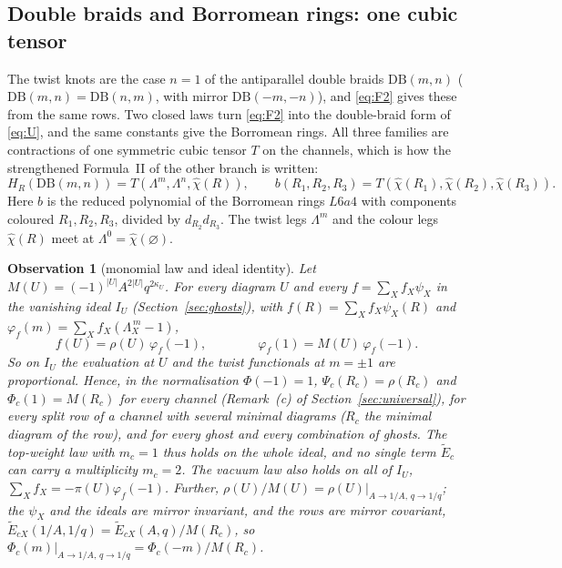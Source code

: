 \documentclass[11pt]{article}
\newtheorem{observation}{Observation}
\newcommand{\Lam}{\Lambda}
\newcommand{\Et}{\widetilde{E}}
\newcommand{\chih}{\hat\chi}
\begin{document}
\subsection{Double braids and Borromean rings: one cubic tensor}\label{sec:cubic}

The twist knots are the case $n=1$ of the antiparallel double braids $\mathrm{DB}(m,n)$ ($\mathrm{DB}(m,n)=\mathrm{DB}(n,m)$,
with mirror $\mathrm{DB}(-m,-n)$), and \eqref{eq:F2} gives these from the same rows.  Two closed laws turn \eqref{eq:F2}
into the double-braid form of \eqref{eq:U}, and the same constants give the Borromean rings.  All three families are
contractions of one symmetric cubic tensor $T$ on the channels, which is how the strengthened Formula~II of the other
branch is written:
\[
H_R(\mathrm{DB}(m,n))=T(\Lam^m,\Lam^n,\chih(R)),\qquad b(R_1,R_2,R_3)=T(\chih(R_1),\chih(R_2),\chih(R_3)).
\]
Here $b$ is the reduced polynomial of the Borromean rings $L6a4$ with components coloured $R_1,R_2,R_3$, divided by
$d_{R_2}d_{R_3}$.  The twist legs $\Lam^m$ and the colour legs $\chih(R)$ meet at $\Lam^0=\chih(\varnothing)$.

\begin{observation}[monomial law and ideal identity]\label{obs:monomial}
Let $M(U)=(-1)^{|U|}A^{2|U|}q^{2\kappa_U}$.  For every diagram $U$ and every $f=\sum_Xf_X\psi_X$ in the vanishing ideal
$I_U$ (Section~\ref{sec:ghosts}), with $f(R)=\sum_Xf_X\psi_X(R)$ and $\varphi_f(m)=\sum_Xf_X(\Lam_X^{\,m}-1)$,
\[
f(U)=\rho(U)\,\varphi_f(-1),\qquad\qquad \varphi_f(1)=M(U)\,\varphi_f(-1).
\]
So on $I_U$ the evaluation at $U$ and the twist functionals at $m=\pm1$ are proportional.  Hence, in the normalisation
$\Phi(-1)=1$, $\Psi_c(R_c)=\rho(R_c)$ and $\Phi_c(1)=M(R_c)$ for every channel (Remark~(c) of
Section~\ref{sec:universal}), for every split row of a channel with several minimal diagrams ($R_c$ the minimal diagram
of the row), and for every ghost and every combination of ghosts.  The top-weight law with $m_c=1$ thus holds on the
whole ideal, and no single term $\Et_c$ can carry a multiplicity $m_c=2$.  The vacuum law also holds on all of $I_U$,
$\sum_Xf_X=-\pi(U)\varphi_f(-1)$.  Further, $\rho(U)/M(U)=\rho(U)|_{A\to1/A,\,q\to1/q}$; the $\psi_X$ and the ideals are
mirror invariant, and the rows are mirror covariant, $\Et_{cX}(1/A,1/q)=\Et_{cX}(A,q)/M(R_c)$, so
$\Phi_c(m)|_{A\to1/A,\,q\to1/q}=\Phi_c(-m)/M(R_c)$.
\end{observation}
\end{document}
